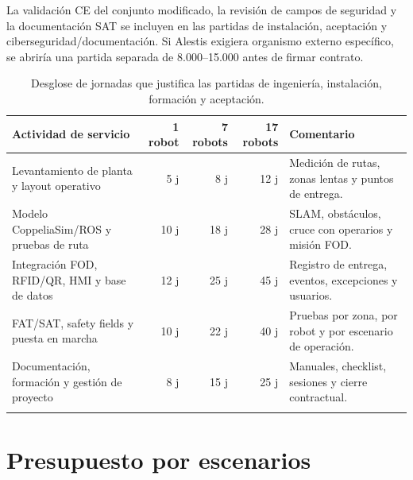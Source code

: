 La validación CE del conjunto modificado, la revisión de campos de seguridad y la documentación SAT se incluyen en las partidas de instalación, aceptación y ciberseguridad/documentación. Si Alestis exigiera organismo externo específico, se abriría una partida separada de 8.000--15.000 \texteuro{} antes de firmar contrato.

\begin{longtable}{P{0.34\textwidth}r r r P{0.20\textwidth}}
\toprule
Actividad de servicio & 1 robot & 7 robots & 17 robots & Comentario\\
\midrule
\endhead
Levantamiento de planta y layout operativo & 5 j & 8 j & 12 j & Medición de rutas, zonas lentas y puntos de entrega.\\
Modelo CoppeliaSim/ROS y pruebas de ruta & 10 j & 18 j & 28 j & SLAM, obstáculos, cruce con operarios y misión FOD.\\
Integración FOD, RFID/QR, HMI y base de datos & 12 j & 25 j & 45 j & Registro de entrega, eventos, excepciones y usuarios.\\
FAT/SAT, safety fields y puesta en marcha & 10 j & 22 j & 40 j & Pruebas por zona, por robot y por escenario de operación.\\
Documentación, formación y gestión de proyecto & 8 j & 15 j & 25 j & Manuales, checklist, sesiones y cierre contractual.\\
\bottomrule
\caption{Desglose de jornadas que justifica las partidas de ingeniería, instalación, formación y aceptación.}
\label{tab:jornadas-ingenieria}
\end{longtable}

\section{Presupuesto por escenarios}

